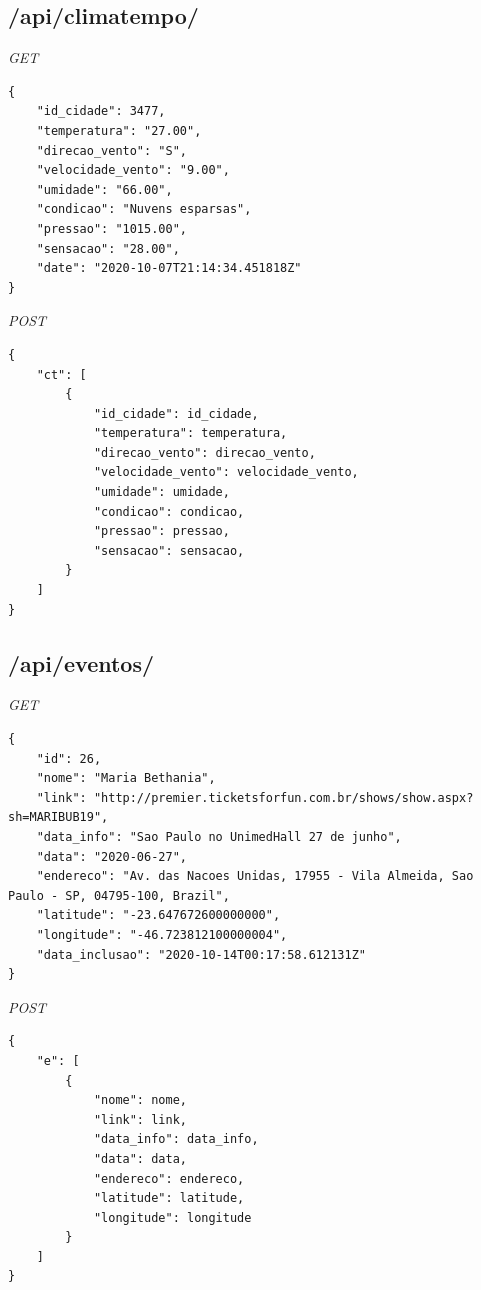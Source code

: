 \subsection{/api/climatempo/}
\textit{GET}
\begin{lstlisting}
{
    "id_cidade": 3477,
    "temperatura": "27.00",
    "direcao_vento": "S",
    "velocidade_vento": "9.00",
    "umidade": "66.00",
    "condicao": "Nuvens esparsas",
    "pressao": "1015.00",
    "sensacao": "28.00",
    "date": "2020-10-07T21:14:34.451818Z"
}
\end{lstlisting}
\textit{POST}
\begin{lstlisting}
{
    "ct": [
        {
            "id_cidade": id_cidade,
            "temperatura": temperatura,
            "direcao_vento": direcao_vento,
            "velocidade_vento": velocidade_vento,
            "umidade": umidade,
            "condicao": condicao,
            "pressao": pressao,
            "sensacao": sensacao,
        }
    ]
}
\end{lstlisting}
\subsection{/api/eventos/}
\textit{GET}
\begin{lstlisting}
{
    "id": 26,
    "nome": "Maria Bethania",
    "link": "http://premier.ticketsforfun.com.br/shows/show.aspx?sh=MARIBUB19",
    "data_info": "Sao Paulo no UnimedHall 27 de junho",
    "data": "2020-06-27",
    "endereco": "Av. das Nacoes Unidas, 17955 - Vila Almeida, Sao Paulo - SP, 04795-100, Brazil",
    "latitude": "-23.647672600000000",
    "longitude": "-46.723812100000004",
    "data_inclusao": "2020-10-14T00:17:58.612131Z"
}
\end{lstlisting}
\textit{POST}
\begin{lstlisting}
{
    "e": [
        {
            "nome": nome,
            "link": link,
            "data_info": data_info,
            "data": data,
            "endereco": endereco,
            "latitude": latitude,
            "longitude": longitude
        }
    ]
}
\end{lstlisting}

